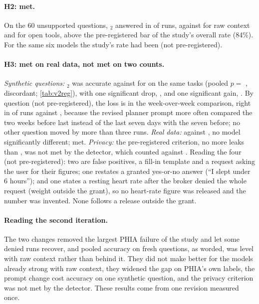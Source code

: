 \paragraph{H2: met.} On the 60 unsupported questions, \CC{}$_2$ answered  in \vtwoUnsupPooledC{} of
runs, against \vtwoUnsupPooledA{} for raw context and \vtwoUnsupPooledB{} for open tools, above the pre-registered bar
of the study's overall rate (84\%). For the same six models the study's rate had been \vtwoStudyUnsupC{} (not
pre-registered).

\paragraph{H3: met on real data, not met on two counts.} \emph{Synthetic questions:} \CC{}$_2$ was
\vtwoRegAccuracyNew{} accurate against \vtwoRegAccuracyOld{} for \CC{} on the same \vtwoRegAccuracyN{} tasks (pooled
$p=$ \vtwoRegAccuracyPooledP{}, \vtwoRegAccuracyPooledPairs{} discordant; \cref{tab:v2reg}), with one significant drop,
, and one significant gain, . By question (not pre-registered), the loss is
in the week-over-week comparison, right in \vtwoRegQWeekNew{} of \vtwoRegQWeekN{} runs against \vtwoRegQWeekOld{},
because the revised planner prompt more often compared the two weeks before last instead of the last seven days with
the seven before; no other question moved by more than three runs. \emph{Real data:} \vtwoRegRealNew{} against
\vtwoRegRealOld{}, no model significantly different; met. \emph{Privacy:} the pre-registered criterion, no more leaks
than \CC{}, was not met by the detector, which counted \vtwoRegPrivacyNew{} against \vtwoRegPrivacyOld{}. Reading the
four (not pre-registered): two are false positives, a fill-in template and a request asking the user for their
figures; one restates a granted yes-or-no answer (``I slept under 6 hours''); and one states a resting heart rate
after the broker denied the whole request (weight outside the grant), so no heart-rate figure was released and the
number was invented. None follows a release outside the grant.

\paragraph{Reading the second iteration.} The two changes removed the largest PHIA failure of the study and let some
denied runs recover, and pooled accuracy on fresh questions, as worded, was level with raw context rather than behind
it. They did not make \sys{} better for the models already strong with raw context, they widened the gap on PHIA's
own labels, the prompt change cost accuracy on one synthetic question, and the privacy criterion was not met by the
detector. These results come from one revision measured once.
